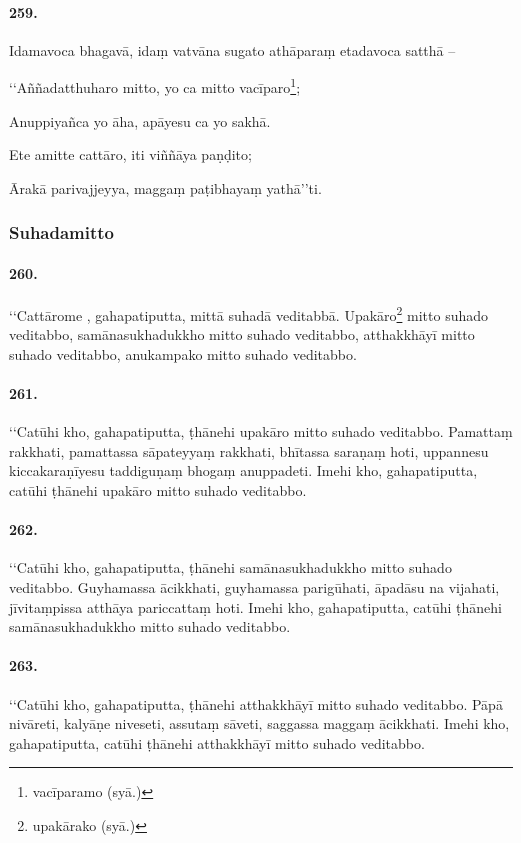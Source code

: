 \paragraph{259.} Idamavoca bhagavā, idaṃ vatvāna sugato athāparaṃ etadavoca satthā –

‘‘Aññadatthuharo mitto, yo ca mitto vacīparo\footnote{vacīparamo (syā.)};

Anuppiyañca yo āha, apāyesu ca yo sakhā.

Ete amitte cattāro, iti viññāya paṇḍito;

Ārakā parivajjeyya, maggaṃ paṭibhayaṃ yathā’’ti.

\subsubsection{Suhadamitto}

\paragraph{260.} ‘‘Cattārome , gahapatiputta, mittā suhadā veditabbā. Upakāro\footnote{upakārako (syā.)} mitto suhado veditabbo, samānasukhadukkho mitto suhado veditabbo, atthakkhāyī mitto suhado veditabbo, anukampako mitto suhado veditabbo.

\paragraph{261.} ‘‘Catūhi kho, gahapatiputta, ṭhānehi upakāro mitto suhado veditabbo. Pamattaṃ rakkhati, pamattassa sāpateyyaṃ rakkhati, bhītassa saraṇaṃ hoti, uppannesu kiccakaraṇīyesu taddiguṇaṃ bhogaṃ anuppadeti. Imehi kho, gahapatiputta, catūhi ṭhānehi upakāro mitto suhado veditabbo.

\paragraph{262.} ‘‘Catūhi kho, gahapatiputta, ṭhānehi samānasukhadukkho mitto suhado veditabbo. Guyhamassa ācikkhati, guyhamassa parigūhati, āpadāsu na vijahati, jīvitaṃpissa atthāya pariccattaṃ hoti. Imehi kho, gahapatiputta, catūhi ṭhānehi samānasukhadukkho mitto suhado veditabbo.

\paragraph{263.} ‘‘Catūhi kho, gahapatiputta, ṭhānehi atthakkhāyī mitto suhado veditabbo. Pāpā nivāreti, kalyāṇe niveseti, assutaṃ sāveti, saggassa maggaṃ ācikkhati. Imehi kho, gahapatiputta, catūhi ṭhānehi atthakkhāyī mitto suhado veditabbo.

